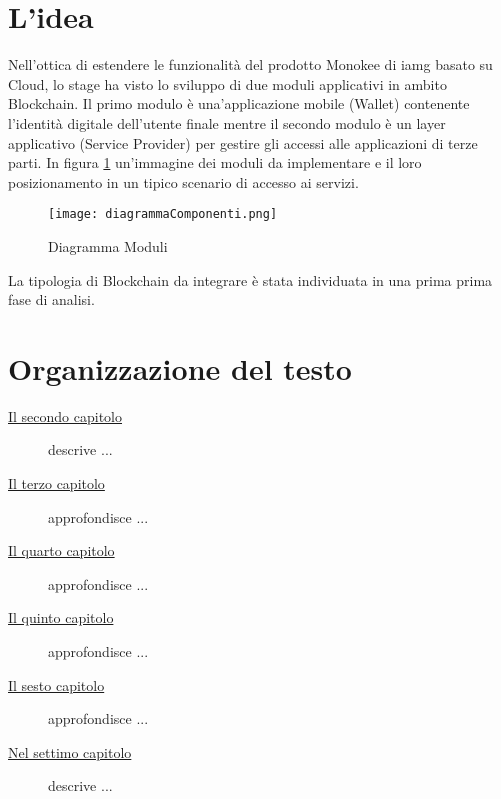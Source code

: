 \section{L'idea}

Nell’ottica di estendere le funzionalità del prodotto Monokee di \gls{iamg} basato su Cloud, lo stage ha visto lo sviluppo di due moduli applicativi in ambito Blockchain.
Il primo modulo è una’applicazione mobile (Wallet) contenente l’identità digitale dell’utente finale mentre il secondo modulo è un layer applicativo (Service Provider) per gestire gli accessi alle applicazioni di terze parti.
In figura \ref{fig:diag-mod} un’immagine dei moduli da implementare e il loro posizionamento in un tipico scenario di accesso ai servizi.
\begin{figure}[!h]
    
    \centering
    \texttt{[image: diagrammaComponenti.png]} 
    \caption{Diagramma Moduli}
    \label{fig:diag-mod} 
\end{figure}
La tipologia di Blockchain da integrare è stata individuata in una prima prima fase di analisi.

\section{Organizzazione del testo}

\begin{description}
    \item[{\hyperref[cap:processi-metodologie]{Il secondo capitolo}}] descrive ...
    
    \item[{\hyperref[cap:descrizione-stage]{Il terzo capitolo}}] approfondisce ...
    
    \item[{\hyperref[cap:analisi-requisiti]{Il quarto capitolo}}] approfondisce ...
    
    \item[{\hyperref[cap:progettazione-codifica]{Il quinto capitolo}}] approfondisce ...
    
    \item[{\hyperref[cap:verifica-validazione]{Il sesto capitolo}}] approfondisce ...
    
    \item[{\hyperref[cap:conclusioni]{Nel settimo capitolo}}] descrive ...
\end{description}


